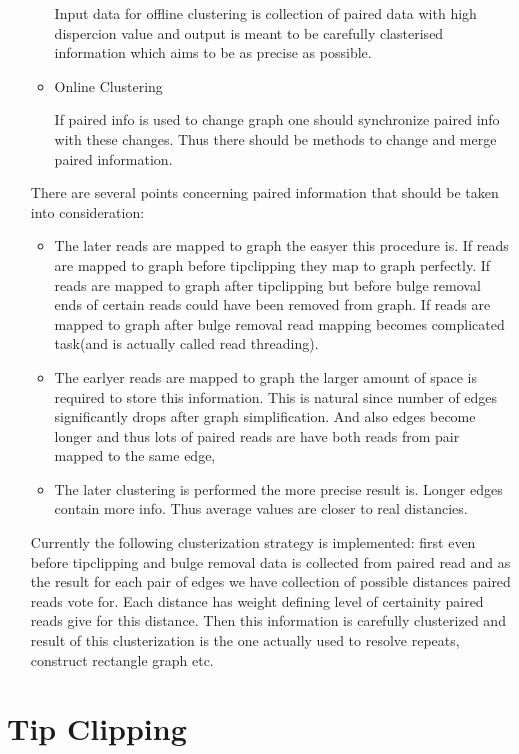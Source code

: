 \documentclass[14pt]{article}
\begin{document}
\begin{itemize}
\begin{itemize}
Input data for offline clustering is collection of paired data with high dispercion value and output is meant to be carefully clasterised information which aims to be as precise as possible.

\item Online Clustering

If paired info is used to change graph one should synchronize paired info with these changes. Thus there should be methods to change and merge paired information.
\end{itemize}

There are several points concerning paired information that should be taken into consideration:

\begin{itemize}
\item The later reads are mapped to graph the easyer this procedure is. If reads are mapped to graph before tipclipping they map to graph perfectly. If reads are mapped to graph after tipclipping but before bulge removal ends of certain reads could have been removed from graph. If reads are mapped to graph after bulge removal read mapping becomes complicated task(and is actually called read threading).

\item The earlyer reads are mapped to graph the larger amount of space is required to store this information. This is natural since number of edges significantly drops after graph simplification. And also edges become longer and thus lots of paired reads are have both reads from pair mapped to the same edge,

\item The later clustering is performed the more precise result is. Longer edges contain more info. Thus average values are closer to real distancies.
\end{itemize}

Currently the following clusterization strategy is implemented: first even before tipclipping and bulge removal data is collected from paired read and as the result for each pair of edges we have collection of possible distances paired reads vote for. Each distance has weight defining level of certainity paired reads give for this distance. Then this information is carefully clusterized and result of this clusterization is the one actually used to resolve repeats, construct rectangle graph etc.

\end{itemize}

\section{Tip Clipping}
\end{document}
